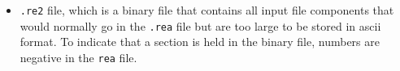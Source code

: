 \documentclass[10pt]{article}
\numberwithin{equation}{section} %
\begin{document}
\begin{itemize}

\item {\tt .re2} file, which is a binary file that contains all input file components that would normally go in the {\tt .rea} file but are too large to be stored in ascii format. To indicate that a section is held in the binary file, numbers are negative in the {\tt rea} file.


\end{itemize}
\end{document}

